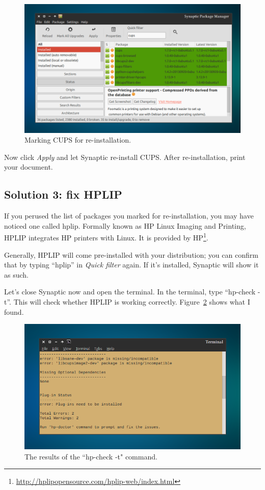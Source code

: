 \documentclass[12pt, a4paper]{article}
\begin{document}
\begin{figure}[!hbp]
  \centering
  \includegraphics[width=1\textwidth]{imgs/filter-failed-8.png}
  \caption{Marking CUPS for re-installation.}
  \label{fig8}
\end{figure}

\noindent Now click \emph{Apply} and let Synaptic re-install CUPS. After re-installation, print your document.

\subsection*{Solution 3: fix HPLIP}

\noindent If you perused the list of packages you marked for re-installation, you may have noticed one called hplip. Formally known as HP Linux Imaging and Printing, HPLIP integrates HP printers with Linux. It is provided by HP\footnote{\url{http://hplipopensource.com/hplip-web/index.html}}.

Generally, HPLIP will come pre-installed with your distribution; you can confirm that by typing “hplip” in \emph{Quick filter} again. If it's installed, Synaptic will show it as such.

Let's close Synaptic now and open the terminal. In the terminal, type “hp-check -t”. This will check whether HPLIP is working correctly. Figure~\ref{fig9} shows what I found.

\begin{figure}[!hbp]
  \centering
  \includegraphics[width=1\textwidth]{imgs/filter-failed-10.png}
  \caption{The results of the ``hp-check -t" command.}
  \label{fig9}
\end{figure}
\end{document}
